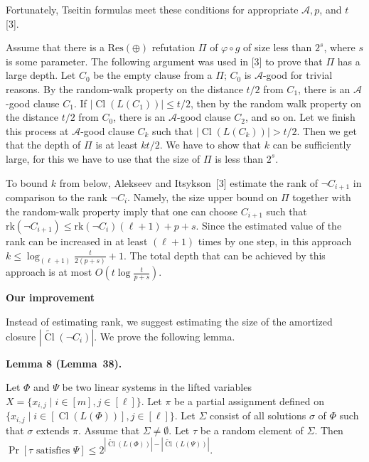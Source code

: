 \documentclass[10pt,a4paper]{article}
\begin{document}
Fortunately, Tseitin formulas meet these conditions for appropriate $\mathcal{A},p$, and $t$ [3].\par



Assume that there is a $\mathrm{Res}(\oplus)$ refutation $\Pi$ of $\varphi\circ g$ of size less than $2^{s}$, where $s$ is some parameter. The following argument was used in [3] to prove that $\Pi$ has a large depth. Let $C_{0}$ be the empty clause from a $\Pi$; $C_{0}$ is $\mathcal{A}$-good for trivial reasons.
By the random-walk property on the distance $t/2$ from $C_{1}$, there is an $\mathcal{A}$-good clause $C_{1}$. If $|\mathop{\mathrm{Cl}}(L(C_{1}))|\leq t/2$, then by the random walk property on the distance $t/2$ from $C_{0}$, there is an $\mathcal{A}$-good clause $C_{2}$, and so on. Let we finish this process at $\mathcal{A}$-good clause $C_{k}$ such that $|\mathop{\mathrm{Cl}}(L(C_{k}))|>t/2$. Then we get that the depth of $\Pi$ is at least $kt/2$. We have to show that $k$ can be sufficiently large, for this we have to use that the size of $\Pi$ is less than $2^{s}$.\par



To bound $k$ from below, Alekseev and Itsykson [3] estimate the rank of $\lnot C_{i+1}$ in comparison to the rank $\lnot C_{i}$. Namely, the size upper bound on $\Pi$ together with the random-walk property imply that one can choose $C_{i+1}$ such that $\mathrm{rk}(\lnot C_{i+1})\leq\mathrm{rk}(\lnot C_{i})(\ell+1)+p+s$. Since the estimated value of the rank can be increased in at least $(\ell+1)$ times by one step, in this approach $k\leq\log_{(\ell+1)}\frac{t}{2(p+s)}+1$. The total depth that can be achieved by this approach is at most $O(t\log\frac{t}{p+s})$.\par


\par\medskip\noindent\textbf{Our improvement}\par


Instead of estimating rank, we suggest estimating the size of the amortized closure $|\widetilde{\mathop{\mathrm{Cl}}}(\lnot C_{i})|$. We prove the following lemma.\par



\par\medskip\noindent\textbf{
Lemma 8 (Lemma 38).
}\par



Let $\Phi$ and $\Psi$ be two linear systems in the lifted variables $X=\{x_{i,j}\mid i\in[m],j\in[\ell]\}$. Let $\pi$ be a partial assignment defined on $\{x_{i,j}\mid i\in[\mathop{\mathrm{Cl}}(L(\Phi))],j\in[\ell]\}$. Let $\Sigma$ consist of all solutions $\sigma$ of $\Phi$ such that $\sigma$ extends $\pi$. Assume that $\Sigma\neq\emptyset$. Let $\tau$ be a random element of $\Sigma$. Then $\Pr[\tau\mbox{ satisfies }\Psi]\leq 2^{|\widetilde{\mathop{\mathrm{Cl}}}(L(\Phi))|-|\widetilde{\mathop{\mathrm{Cl}}}(L(\Psi))|}$.\par
\end{document}
